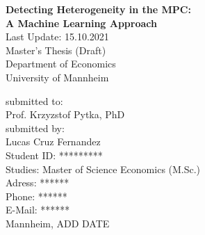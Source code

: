 \begin{titlepage}

\begin{center}

\vspace*{1,2cm}

\huge {\bfseries Detecting Heterogeneity in the MPC: \\ A Machine Learning Approach}\\[1.8cm]
\Large {Last Update: 15.10.2021}\\[1cm]

\Large {Master's Thesis (Draft)}\\[1cm]
\large {Department of Economics}\\[0.2cm]

\large {University of Mannheim}\\[0.5cm]

\end{center}

\vfill

\noindent submitted to:\\
Prof. Krzyzstof Pytka, PhD\\[1cm]
submitted by:\\
Lucas Cruz Fernandez\\[1cm]
Student ID: *********\\
Studies: Master of Science Economics (M.Sc.)\\[1cm]
Adress: ****** \\
Phone: ****** \\
E-Mail: ****** \\[1cm]
Mannheim, ADD DATE

\setcounter{page}{0}

\end{titlepage}
